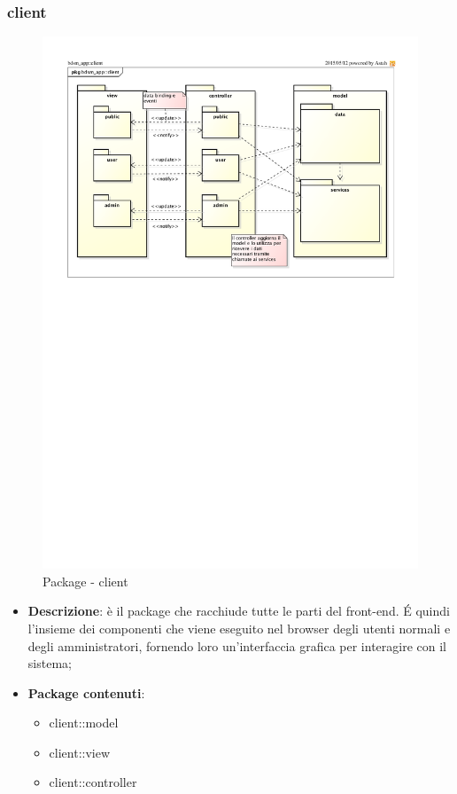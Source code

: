	\pagebreak

	\subsubsection{client} %
	\label{ssub:bdsm_app_client}
	\begin{figure}[htbp]
		\centering
		\centerline{\includegraphics[scale=0.9]{./images/client/client.pdf}}
		\label{fig:package_client}
		\caption{Package - client}
	\end{figure}

	\begin{itemize}
		\item \textbf{Descrizione}: è il package che racchiude tutte le parti del front-end. \'E quindi l'insieme dei componenti che viene eseguito nel browser degli utenti normali e degli amministratori, fornendo loro un'interfaccia grafica per interagire con il sistema;
		\item \textbf{Package contenuti}:
			\begin{itemize}
				\item client::model
				\item client::view
				\item client::controller
			\end{itemize}
	\end{itemize}

